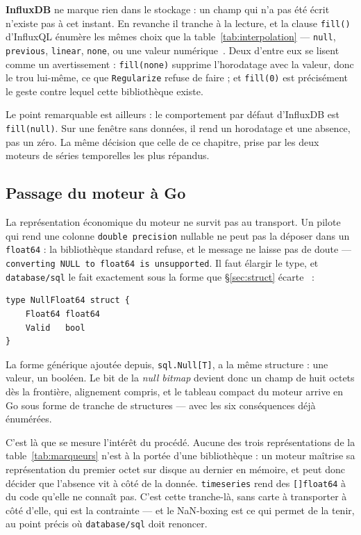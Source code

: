 \documentclass[11pt,a4paper]{report}
\begin{document}
\textbf{InfluxDB} ne marque rien dans le stockage : un champ qui n'a pas
été écrit n'existe pas à cet instant. En revanche il tranche à la
lecture, et la clause \texttt{fill()} d'InfluxQL énumère les mêmes
choix que la table~\ref{tab:interpolation} --- \texttt{null},
\texttt{previous}, \texttt{linear}, \texttt{none}, ou une valeur
numérique~\cite{influxfill}. Deux d'entre eux se lisent comme un
avertissement : \texttt{fill(none)} supprime l'horodatage avec la valeur,
donc le trou lui-même, ce que \texttt{Regularize} refuse de faire ; et
\texttt{fill(0)} est précisément le geste contre lequel cette
bibliothèque existe.

Le point remarquable est ailleurs : le comportement par défaut
d'InfluxDB est \texttt{fill(null)}. Sur une fenêtre sans données, il
rend un horodatage et une absence, pas un zéro. La même décision que
celle de ce chapitre, prise par les deux moteurs de séries temporelles
les plus répandus.

\subsection{Passage du moteur à Go}

La représentation économique du moteur ne survit pas au transport. Un
pilote qui rend une colonne \texttt{double\ precision} nullable ne peut
pas la déposer dans un \texttt{float64} : la bibliothèque standard
refuse, et le message ne laisse pas de doute ---
\texttt{converting\ NULL\ to\ float64\ is\ unsupported}. Il faut élargir
le type, et \texttt{database/sql} le fait exactement sous la forme que
§\ref{sec:struct} écarte~\cite{gosql} :

\begin{verbatim}
type NullFloat64 struct {
    Float64 float64
    Valid   bool
}
\end{verbatim}

La forme générique ajoutée depuis, \texttt{sql.Null[T]}, a la même
structure : une valeur, un booléen. Le bit de la \emph{null bitmap}
devient donc un champ de huit octets dès la frontière, alignement
compris, et le tableau compact du moteur arrive en Go sous forme de
tranche de structures --- avec les six conséquences déjà énumérées.

C'est là que se mesure l'intérêt du procédé. Aucune des trois
représentations de la table~\ref{tab:marqueurs} n'est à la portée d'une
bibliothèque : un
moteur maîtrise sa représentation du premier octet sur disque au dernier
en mémoire, et peut donc décider que l'absence vit à côté de la donnée.
\texttt{timeseries} rend des \texttt{[]float64} à du code qu'elle ne
connaît pas. C'est cette tranche-là, sans carte à transporter à côté
d'elle, qui est la contrainte --- et le NaN-boxing est ce qui permet de
la tenir, au point précis où \texttt{database/sql} doit renoncer.
\end{document}

